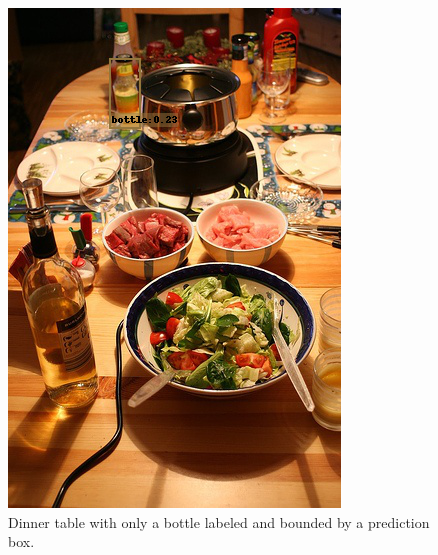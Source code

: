 \documentclass{article}
\begin{document}
\begin{figure}[H]
    \centering
    \includegraphics[width=\textwidth]{Assignments/Assignment_4/plots/vgg/008591.png}
    \caption{Dinner table with only a bottle labeled and bounded by a prediction box.}
    \label{fig:voc3}
\end{figure}
\end{document}
